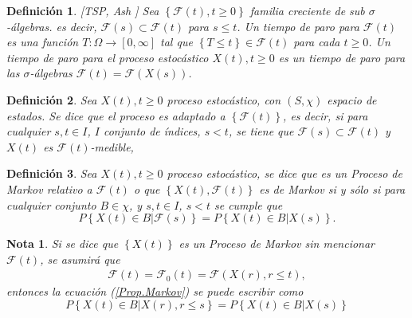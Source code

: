 \documentclass{article}
\newtheorem{Def}{Definición}
\newtheorem{Note}{Nota}
\begin{document}
\begin{Def}\label{Def.Tiempo.Paro}[TSP, Ash \cite{RBA}]
Sea $\left\{\mathcal{F}\left(t\right),t\geq0\right\}$ familia
creciente de sub $\sigma$-\'algebras. es decir,
$\mathcal{F}\left(s\right)\subset\mathcal{F}\left(t\right)$ para
$s\leq t$. Un tiempo de paro para $\mathcal{F}\left(t\right)$ es
una funci\'on $T:\Omega\rightarrow\left[0,\infty\right]$ tal que
$\left\{T\leq t\right\}\in\mathcal{F}\left(t\right)$ para cada
$t\geq0$. Un tiempo de paro para el proceso estoc\'astico
$X\left(t\right),t\geq0$ es un tiempo de paro para las
$\sigma$-\'algebras
$\mathcal{F}\left(t\right)=\mathcal{F}\left(X\left(s\right)\right)$.
\end{Def}

\begin{Def}
Sea $X\left(t\right),t\geq0$ proceso estoc\'astico, con
$\left(S,\chi\right)$ espacio de estados. Se dice que el proceso
es adaptado a $\left\{\mathcal{F}\left(t\right)\right\}$, es
decir, si para cualquier $s,t\in I$, $I$ conjunto de \'indices,
$s<t$, se tiene que
$\mathcal{F}\left(s\right)\subset\mathcal{F}\left(t\right)$ y
$X\left(t\right)$ es $\mathcal{F}\left(t\right)$-medible,
\end{Def}

\begin{Def}
Sea $X\left(t\right),t\geq0$ proceso estoc\'astico, se dice que es
un Proceso de Markov relativo a $\mathcal{F}\left(t\right)$ o que
$\left\{X\left(t\right),\mathcal{F}\left(t\right)\right\}$ es de
Markov si y s\'olo si para cualquier conjunto $B\in\chi$,  y
$s,t\in I$, $s<t$ se cumple que
\begin{equation}\label{Prop.Markov}
P\left\{X\left(t\right)\in
B|\mathcal{F}\left(s\right)\right\}=P\left\{X\left(t\right)\in
B|X\left(s\right)\right\}.
\end{equation}
\end{Def}
\begin{Note}
Si se dice que $\left\{X\left(t\right)\right\}$ es un Proceso de
Markov sin mencionar $\mathcal{F}\left(t\right)$, se asumir\'a que
\begin{eqnarray*}
\mathcal{F}\left(t\right)=\mathcal{F}_{0}\left(t\right)=\mathcal{F}\left(X\left(r\right),r\leq
t\right),
\end{eqnarray*}
entonces la ecuaci\'on (\ref{Prop.Markov}) se puede escribir como
\begin{equation}
P\left\{X\left(t\right)\in B|X\left(r\right),r\leq s\right\} =
P\left\{X\left(t\right)\in B|X\left(s\right)\right\}
\end{equation}
\end{Note}
\end{document}

